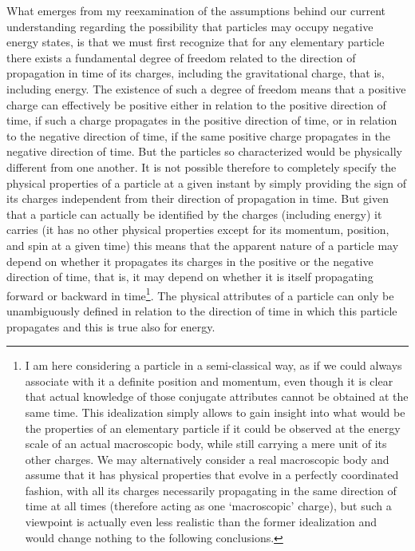 \documentclass[notitlepage,12pt]{report}
\begin{document}
What emerges from my reexamination of the assumptions behind our current understanding regarding the possibility that particles may occupy negative energy states, is that we must first recognize that for any elementary particle there exists a fundamental degree of freedom related to the direction of propagation in time of its charges, including the gravitational charge, that is, including energy. The existence of such a degree of freedom means that a positive charge can effectively be positive either in relation to the positive direction of time, if such a charge propagates in the positive direction of time, or in relation to the negative direction of time, if the same positive charge propagates in the negative direction of time. But the particles so characterized would be physically different from one another. It is not possible therefore to completely specify the physical properties of a particle at a given instant by simply providing the sign of its charges independent from their direction of propagation in time. But given that a particle can actually be identified by the charges (including energy) it carries (it has no other physical properties except for its momentum, position, and spin at a given time) this means that the apparent nature of a particle may depend on whether it propagates its charges in the positive or the negative direction of time, that is, it may depend on whether it is itself propagating forward or backward in time\footnote{I am here considering a particle in a semi-classical way, as if we could always associate with it a definite position and momentum, even though it is clear that actual knowledge of those conjugate attributes cannot be obtained at the same time. This idealization simply allows to gain insight into what would be the properties of an elementary particle if it could be observed at the energy scale of an actual macroscopic body, while still carrying a mere unit of its other charges. We may alternatively consider a real macroscopic body and assume that it has physical properties that evolve in a perfectly coordinated fashion, with all its charges necessarily propagating in the same direction of time at all times (therefore acting as one `macroscopic' charge), but such a viewpoint is actually even less realistic than the former idealization and would change nothing to the following conclusions.}. The physical attributes of a particle can only be unambiguously defined in relation to the direction of time in which this particle propagates and this is true also for energy.
\end{document}
